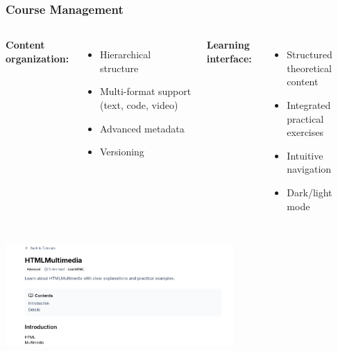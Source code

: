 \documentclass{beamer}
\begin{document}
\begin{frame}
\frametitle{Course Management}
\begin{columns}
\textbf{Content organization:}
\begin{itemize}
    \item Hierarchical structure
    \item Multi-format support (text, code, video)
    \item Advanced metadata
    \item Versioning
\end{itemize}

\textbf{Learning interface:}
\begin{itemize}
    \item Structured theoretical content
    \item Integrated practical exercises
    \item Intuitive navigation
    \item Dark/light mode
\end{itemize}
\end{columns}

\vspace{0.3cm}
\begin{center}
    \includegraphics[width=0.65\textwidth,height=4cm,keepaspectratio]{week_3_img/part1.png}
\end{center}
\end{frame}
\end{document}
